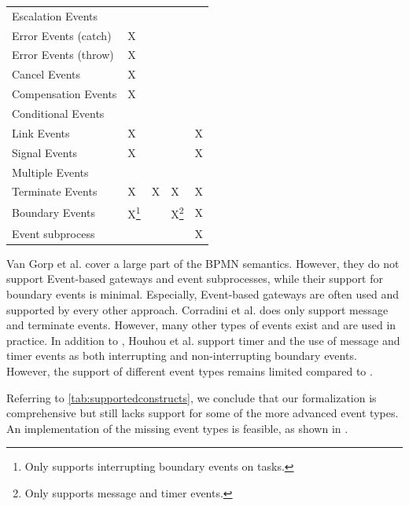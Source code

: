 \documentclass[submission, copyright, creativecommons]{eptcs}
\begin{document}
\begin{table}[htbp]
\begin{tabular}{l l l l l}
      Escalation Events & & & & \\
      Error Events (catch) & X & & &\\
      Error Events (throw) & X & & &\\
      Cancel Events & X & & &\\
      Compensation Events & X & & &\\
      Conditional Events & & & &\\
      Link Events & X & & & X\\
      Signal Events & X & & & X\\
      Multiple Events &  & & & \\
      Terminate Events & X & X & X & X\\
     Boundary Events & X\footnote{Only supports interrupting boundary events on tasks.} & & X\footnote{Only supports message and timer events.} & X\\ %
      Event subprocess &  &  &  & X\\
    \end{tabular}
\end{table}

Van Gorp et al. \cite{vangorpVisualTokenbasedFormalization2013} cover a large part of the BPMN semantics.
However, they do not support Event-based gateways and event subprocesses, while their support for boundary events is minimal.
Especially, Event-based gateways are often used and supported by every other approach.
Corradini et al. \cite{corradiniFormalApproachAnalysis2021} does only support message and terminate events.
However, many other types of events exist and are used in practice.
In addition to \cite{corradiniFormalApproachAnalysis2021}, Houhou et al. \cite{houhouFirstOrderLogicVerification2022} support timer and the use of message and timer events as both interrupting and non-interrupting boundary events.
However, the support of different event types remains limited compared to \cite{vangorpVisualTokenbasedFormalization2013}.

Referring to \cref{tab:supportedconstructs}, we conclude that our formalization is comprehensive but still lacks support for some of the more advanced event types.
An implementation of the missing event types is feasible, as shown in \cite{vangorpVisualTokenbasedFormalization2013}.
\end{document}
